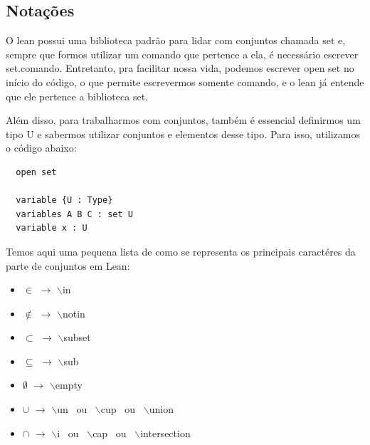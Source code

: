   \subsection{Notações}
  O lean possui uma biblioteca padrão para lidar com conjuntos chamada {\selectfont set} e, sempre que formos utilizar um comando que pertence a ela, é necessário escrever {\selectfont set.comando}. Entretanto, pra facilitar nossa vida, podemos escrever {\selectfont open set} no início do código, o que permite escrevermos somente {\selectfont comando}, e o lean já entende que ele pertence a biblioteca set.

  Além disso, para trabalharmos com conjuntos, também é essencial definirmos um tipo {\selectfont U} e sabermos utilizar conjuntos e elementos desse tipo. Para isso, utilizamos o código abaixo:

  \begin{lstlisting}
  open set

  variable {U : Type}
  variables A B C : set U
  variable x : U \end{lstlisting}

  Temos aqui uma pequena lista de como se representa os principais caractéres da parte de conjuntos em Lean:

  \begin{itemize}
      \item $\in$ $\rightarrow$ $\backslash$in

      \item $\notin$ $\rightarrow$ $\backslash$notin

      \item $\subset$ $\rightarrow$ $\backslash$subset

      \item $\subseteq$ $\rightarrow$ $\backslash$sub

      \item $\emptyset$ $\rightarrow$ $\backslash$empty

      \item $\cup$ $\rightarrow$ $\backslash$un \ ou \ $\backslash$cup \ ou \ $\backslash$union

      \item $\cap$ $\rightarrow$ $\backslash$i \ ou \ $\backslash$cap \ ou \ $\backslash$intersection
  \end{itemize}

